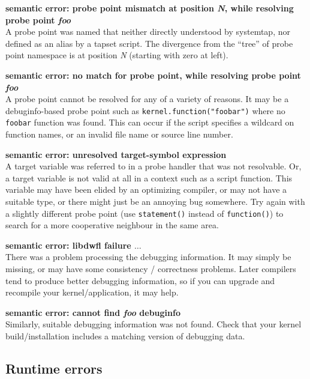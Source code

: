 \documentclass{article}
\begin{document}
\begin{description}
\item{\bf semantic error: probe point mismatch at position {\em N},
while resolving probe point {\em foo}} \\ A probe point was named that
neither directly understood by systemtap, nor defined as an alias by a
tapset script.  The divergence from the ``tree'' of probe point
namespace is at position {\em N} (starting with zero at left).

\item{\bf semantic error: no match for probe point, while resolving
probe point {\em foo}} \\ A probe point cannot be resolved for any of
a variety of reasons.  It may be a debuginfo-based probe point such as
\verb+kernel.function("foobar")+ where no \verb+foobar+ function was
found.  This can occur if the script specifies a wildcard on function
names, or an invalid file name or source line number.

\item{\bf semantic error: unresolved target-symbol expression} \\ A
target variable was referred to in a probe handler that was not
resolvable.  Or, a target variable is not valid at all in a context
such as a script function.  This variable may have been elided by an
optimizing compiler, or may not have a suitable type, or there might
just be an annoying bug somewhere.  Try again with a slightly
different probe point (use \verb+statement()+ instead of
\verb+function()+) to search for a more cooperative neighbour in the
same area.

\item{\bf semantic error: libdwfl failure $\ldots$} \\ There was a
problem processing the debugging information.  It may simply be
missing, or may have some consistency / correctness problems.  Later
compilers tend to produce better debugging information, so if you can
upgrade and recompile your kernel/application, it may help.

\item{\bf semantic error: cannot find {\em foo} debuginfo} \\ Similarly,
suitable debugging information was not found.  Check that your kernel
build/installation includes a matching version of debugging data.
\end{description}

\subsection{Runtime errors}
\end{document}
